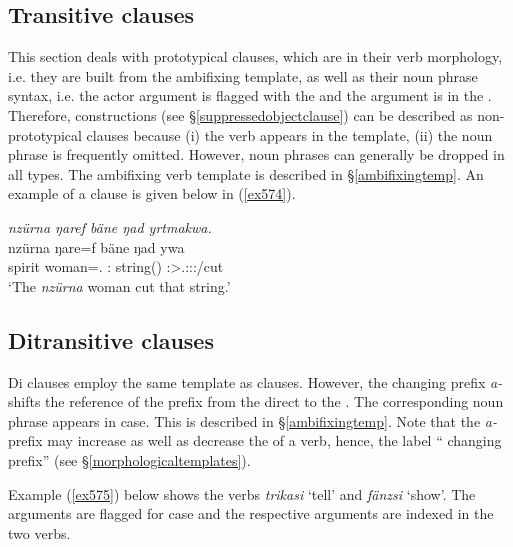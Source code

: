 \subsection{Transitive clauses}\label{transitiveclause}

This section deals with prototypical  clauses, which are  in their verb morphology, i.e. they are built from the ambifixing  template, as well as their noun phrase syntax, i.e. the actor argument is flagged with the  and the  argument is in the . Therefore,  constructions (see \S{}\ref{suppressedobjectclause}) can be described as non-prototypical  clauses because (i) the verb appears in the  template, (ii) the  noun phrase is frequently omitted. However, noun phrases can generally be dropped in all  types. The ambifixing verb template is described in \S{}\ref{ambifixingtemp}. An example of a  clause is given below in (\ref{ex574}).

\begin{exe}
	\ex \emph{nzürna ŋaref bäne ŋad yrtmakwa.}\\
	\gll nzürna ŋare=f bäne ŋad ywa\\
	spirit woman=\Erg.\Sg{} \Dem:\Med{} string(\Abs) \Sg:\Sbj>\Tsg.\Masc:\Obj:\Pst:\Ipfv/cut\\
	\trans `The \emph{nzürna} woman cut that string.'
	\label{ex574}
\end{exe}

\subsection{Ditransitive clauses}\label{ditransitiveclause}

Di clauses employ the same template as  clauses. However, the  changing prefix \emph{a-} shifts the reference of the  prefix from the direct  to the . The corresponding noun phrase appears in  case. This is described in \S{}\ref{ambifixingtemp}. Note that the \emph{a-} prefix may increase as well as decrease the  of a verb, hence, the label `` changing prefix'' (see \S{}\ref{morphologicaltemplates}).%

Example (\ref{ex575}) below shows the verbs \emph{trikasi} `tell' and \emph{fänzsi} `show'. The  arguments are flagged for  case and the respective arguments are indexed in the two verbs.%

